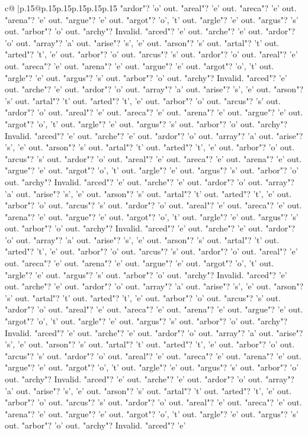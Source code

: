 \documentclass{article}
\begin{document}
{\begin{supertabular}{c@{$\;$}|p{.15\linewidth}@{}p{.15\linewidth}p{.15\linewidth}p{.15\linewidth}p{.15\linewidth}p{.15\linewidth}}
{{{"ardor"? 'o' out. "areal"? 'e' out. "areca"? 'e' out. "arena"? 'e' out. "argue"? 'e' out. "argot"? 'o', 't' out. "argle"? 'e' out. "argus"? 's' out. "arbor"? 'o' out. "archy"? Invalid. "arced"? 'e' out. "arche"? 'e' out. "ardor"? 'o' out. "array"? 'a' out. "arise"? 's', 'e' out. "arson"? 's' out. "artal"? 't' out. "arted"? 't', 'e' out. "arbor"? 'o' out. "arcus"? 's' out. "ardor"? 'o' out. "areal"? 'e' out. "areca"? 'e' out. "arena"? 'e' out. "argue"? 'e' out. "argot"? 'o', 't' out. "argle"? 'e' out. "argus"? 's' out. "arbor"? 'o' out. "archy"? Invalid. "arced"? 'e' out. "arche"? 'e' out. "ardor"? 'o' out. "array"? 'a' out. "arise"? 's', 'e' out. "arson"? 's' out. "artal"? 't' out. "arted"? 't', 'e' out. "arbor"? 'o' out. "arcus"? 's' out. "ardor"? 'o' out. "areal"? 'e' out. "areca"? 'e' out. "arena"? 'e' out. "argue"? 'e' out. "argot"? 'o', 't' out. "argle"? 'e' out. "argus"? 's' out. "arbor"? 'o' out. "archy"? Invalid. "arced"? 'e' out. "arche"? 'e' out. "ardor"? 'o' out. "array"? 'a' out. "arise"? 's', 'e' out. "arson"? 's' out. "artal"? 't' out. "arted"? 't', 'e' out. "arbor"? 'o' out. "arcus"? 's' out. "ardor"? 'o' out. "areal"? 'e' out. "areca"? 'e' out. "arena"? 'e' out. "argue"? 'e' out. "argot"? 'o', 't' out. "argle"? 'e' out. "argus"? 's' out. "arbor"? 'o' out. "archy"? Invalid. "arced"? 'e' out. "arche"? 'e' out. "ardor"? 'o' out. "array"? 'a' out. "arise"? 's', 'e' out. "arson"? 's' out. "artal"? 't' out. "arted"? 't', 'e' out. "arbor"? 'o' out. "arcus"? 's' out. "ardor"? 'o' out. "areal"? 'e' out. "areca"? 'e' out. "arena"? 'e' out. "argue"? 'e' out. "argot"? 'o', 't' out. "argle"? 'e' out. "argus"? 's' out. "arbor"? 'o' out. "archy"? Invalid. "arced"? 'e' out. "arche"? 'e' out. "ardor"? 'o' out. "array"? 'a' out. "arise"? 's', 'e' out. "arson"? 's' out. "artal"? 't' out. "arted"? 't', 'e' out. "arbor"? 'o' out. "arcus"? 's' out. "ardor"? 'o' out. "areal"? 'e' out. "areca"? 'e' out. "arena"? 'e' out. "argue"? 'e' out. "argot"? 'o', 't' out. "argle"? 'e' out. "argus"? 's' out. "arbor"? 'o' out. "archy"? Invalid. "arced"? 'e' out. "arche"? 'e' out. "ardor"? 'o' out. "array"? 'a' out. "arise"? 's', 'e' out. "arson"? 's' out. "artal"? 't' out. "arted"? 't', 'e' out. "arbor"? 'o' out. "arcus"? 's' out. "ardor"? 'o' out. "areal"? 'e' out. "areca"? 'e' out. "arena"? 'e' out. "argue"? 'e' out. "argot"? 'o', 't' out. "argle"? 'e' out. "argus"? 's' out. "arbor"? 'o' out. "archy"? Invalid. "arced"? 'e' out. "arche"? 'e' out. "ardor"? 'o' out. "array"? 'a' out. "arise"? 's', 'e' out. "arson"? 's' out. "artal"? 't' out. "arted"? 't', 'e' out. "arbor"? 'o' out. "arcus"? 's' out. "ardor"? 'o' out. "areal"? 'e' out. "areca"? 'e' out. "arena"? 'e' out. "argue"? 'e' out. "argot"? 'o', 't' out. "argle"? 'e' out. "argus"? 's' out. "arbor"? 'o' out. "archy"? Invalid. "arced"? 'e' out. "arche"? 'e' out. "ardor"? 'o' out. "array"? 'a' out. "arise"? 's', 'e' out. "arson"? 's' out. "artal"? 't' out. "arted"? 't', 'e' out. "arbor"? 'o' out. "arcus"? 's' out. "ardor"? 'o' out. "areal"? 'e' out. "areca"? 'e' out. "arena"? 'e' out. "argue"? 'e' out. "argot"? 'o', 't' out. "argle"? 'e' out. "argus"? 's' out. "arbor"? 'o' out. "archy"? Invalid. "arced"? 'e' }}}
\end{supertabular}}
\end{document}

